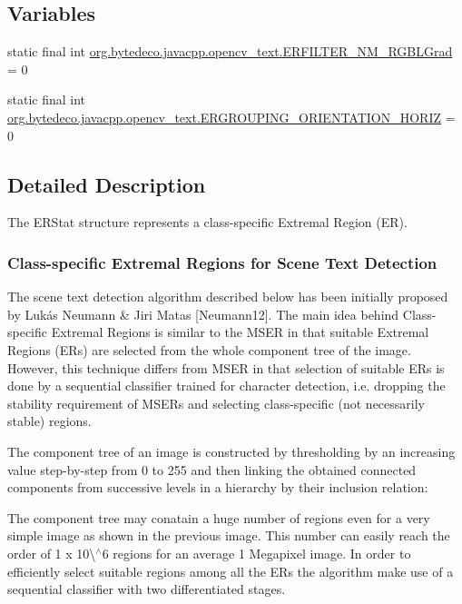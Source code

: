 \subsection*{Variables}
\begin{DoxyCompactItemize}
\item 
static final int \hyperlink{group__text__detect_gad0d3e0c8791f14093e736cd2da75632d}{org.\+bytedeco.\+javacpp.\+opencv\+\_\+text.\+E\+R\+F\+I\+L\+T\+E\+R\+\_\+\+N\+M\+\_\+\+R\+G\+B\+L\+Grad} = 0
\item 
static final int \hyperlink{group__text__detect_gab646588b9db6ae1e1aae89cc09ea4059}{org.\+bytedeco.\+javacpp.\+opencv\+\_\+text.\+E\+R\+G\+R\+O\+U\+P\+I\+N\+G\+\_\+\+O\+R\+I\+E\+N\+T\+A\+T\+I\+O\+N\+\_\+\+H\+O\+R\+IZ} = 0
\end{DoxyCompactItemize}


\subsection{Detailed Description}
The E\+R\+Stat structure represents a class-\/specific Extremal Region (ER). 

\subsubsection*{Class-\/specific Extremal Regions for Scene Text Detection }

The scene text detection algorithm described below has been initially proposed by Lukás Neumann \& Jiri Matas \mbox{[}Neumann12\mbox{]}. The main idea behind Class-\/specific Extremal Regions is similar to the M\+S\+ER in that suitable Extremal Regions (E\+Rs) are selected from the whole component tree of the image. However, this technique differs from M\+S\+ER in that selection of suitable E\+Rs is done by a sequential classifier trained for character detection, i.\+e. dropping the stability requirement of M\+S\+E\+Rs and selecting class-\/specific (not necessarily stable) regions. 

The component tree of an image is constructed by thresholding by an increasing value step-\/by-\/step from 0 to 255 and then linking the obtained connected components from successive levels in a hierarchy by their inclusion relation\+: 

 

The component tree may conatain a huge number of regions even for a very simple image as shown in the previous image. This number can easily reach the order of 1 x 10\textbackslash{}$^\wedge$6 regions for an average 1 Megapixel image. In order to efficiently select suitable regions among all the E\+Rs the algorithm make use of a sequential classifier with two differentiated stages. 

